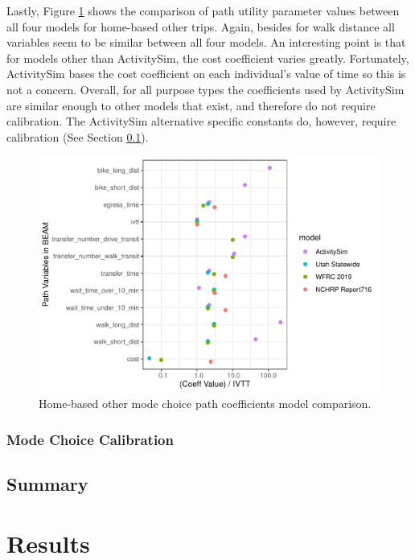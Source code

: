 \documentclass[12pt, oneside, openright]{byuthesis}
\begin{document}
Lastly, Figure \ref{fig:hbo} shows the comparison of path utility parameter values between all four models for home-based other trips. Again, besides for walk distance all variables seem to be similar between all four models. An interesting point is that for models other than ActivitySim, the cost coefficient varies greatly. Fortunately, ActivitySim bases the cost coefficient on each individual's value of time so this is not a concern. Overall, for all purpose types the coefficients used by ActivitySim are similar enough to other models that exist, and therefore do not require calibration. The ActivitySim alternative specific constants do, however, require calibration (See Section \ref{clib}).

\begin{figure}

{\centering \includegraphics{thesis_files/figure-latex/hbo-1} 

}

\caption{Home-based other mode choice path coefficients model comparison.}\label{fig:hbo}
\end{figure}

\hypertarget{clib}{%
\subsection{Mode Choice Calibration}\label{clib}}

\hypertarget{summary}{%
\section{Summary}\label{summary}}

\hypertarget{results}{%
\chapter{Results}\label{results}}
\end{document}
